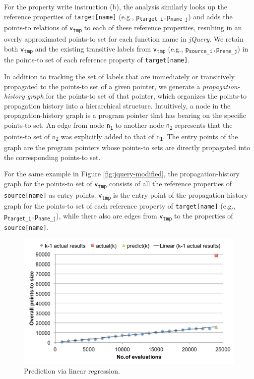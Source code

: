 For the property write instruction (b), the analysis similarly looks up the reference properties of {\tt target[name]} (e.g., {\tt p\textsubscript{target\_i}.p\textsubscript{name\_j}}) and adds the points-to relations of {\tt v\textsubscript{tmp}} to each of these reference properties, resulting in an overly approximated points-to set for each function name in {\it jQuery}. We retain both {\tt v\textsubscript{tmp}} and the existing transitive labels from {\tt v\textsubscript{tmp}} (e.g., {\tt p\textsubscript{source\_i}.p\textsubscript{name\_j}}) in the points-to set of each reference property of {\tt target[name]}.

In addition to tracking the set of labels that are immediately or transitively propagated to the points-to set of a given pointer, we generate a {\it propagation-history graph} for the points-to set of that pointer, which organizes the points-to propagation history into a hierarchical structure. Intuitively, a node in the propagation-history graph is a program pointer that has bearing on the specific points-to set. An edge from node {\tt n\textsubscript{1}} to another node {\tt n\textsubscript{2}} represents that the points-to set of {\tt n\textsubscript{2}} was explicitly added to that of {\tt n\textsubscript{1}}. The entry points of the graph are the program pointers whose points-to sets are directly propagated into the corresponding points-to set. 

For the same example in Figure \ref{fig:jquery-modified}, the propagation-history graph for the points-to set of {\tt v\textsubscript{tmp}} consists of all the reference properties of {\tt source[name]} as entry points. {\tt v\textsubscript{tmp}} is the entry point of the propagation-history graph for the points-to set of each reference property of {\tt target[name]} (e.g., {\tt p\textsubscript{target\_i}.p\textsubscript{name\_j}}), while there also are edges from {\tt v\textsubscript{tmp}} to the properties of {\tt source[name]}.

\begin{figure}[th!]
        \includegraphics[width=\columnwidth]{linear}
\caption{\textmd{Prediction via linear regression.}}
\label{fig:linear}
\end{figure}

